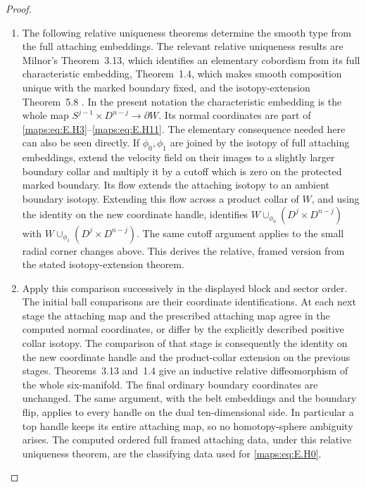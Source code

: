 \begin{proof}
\begin{enumerate}[label={$\langle1\rangle$\arabic*.},leftmargin=*]
\item The following relative uniqueness theorems determine the smooth
type from the full attaching embeddings.  The relevant relative uniqueness
results are Milnor's Theorem~3.13, which identifies an elementary
cobordism from its full characteristic embedding, Theorem~1.4,
which makes smooth composition unique with the marked boundary
fixed, and the isotopy-extension Theorem~5.8
\cite{mapsMilnor65}.  In the present notation the characteristic
embedding is the whole map
$S^{j-1}\times D^{n-j}\longrightarrow\partial W$.  Its normal coordinates
are part of \eqref{maps:eq:E.H3}--\eqref{maps:eq:E.H11}.  The elementary consequence needed
here can also be seen directly.  If $\phi_0,\phi_1$ are joined
by the isotopy of full attaching embeddings, extend
the velocity field on their images to a slightly larger boundary
collar and multiply it by a cutoff which is zero on the protected
marked boundary.  Its flow extends the attaching isotopy to an
ambient boundary isotopy.  Extending this flow across a product
collar of $W$, and using the identity on the new coordinate handle,
identifies $W\cup_{\phi_0}(D^j\times D^{n-j})$ with
$W\cup_{\phi_1}(D^j\times D^{n-j})$.  The same cutoff argument
applies to the small radial corner changes above.  This derives
the relative, framed version from the stated isotopy-extension
theorem.

\item Apply this comparison successively in the displayed block and
sector order.  The initial ball comparisons are their coordinate
identifications.  At each next stage the attaching map
and the prescribed attaching map agree in the computed normal
coordinates, or differ by the explicitly described positive
collar isotopy.  The comparison of that stage is consequently
the identity on the new coordinate handle and the product-collar
extension on the previous stages.  Theorems~3.13 and~1.4 give an
inductive relative diffeomorphism of the whole six-manifold.
The final ordinary boundary coordinates are unchanged.  The
same argument, with the belt embeddings and the boundary flip, applies to every handle on the dual ten-dimensional
side.  In particular a top handle keeps its entire attaching map, so no homotopy-sphere ambiguity arises.  The computed
ordered full framed attaching data, under this relative uniqueness
theorem, are the classifying data used for \eqref{maps:eq:E.H0}.
\end{enumerate}
\end{proof}

\clearpage
